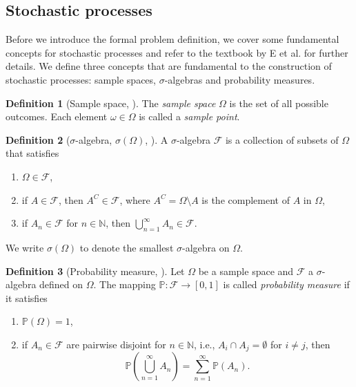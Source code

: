 \documentclass[12pt]{article}
\theoremstyle{definition}
\newtheorem{definition}[definition]{Definition}
\numberwithin{equation}{section}
\newcommand{\N}{\mathbb{N}}
\newcommand{\BP}{\mathbb{P}}
\newcommand{\CF}{\mathcal{F}}
\begin{document}
 \subsection{Stochastic processes}
 \label{subsec:stochastic_processes}
 Before we introduce the formal problem definition, we cover some fundamental concepts for stochastic processes and refer to the textbook by E et al.\cite{eAppliedStochasticAnalysis2021} for further details. We define three concepts that are fundamental to the construction of stochastic processes: sample spaces, $\sigma$-algebras and probability measures.
 \begin{definition}[Sample space,  ]
   The \emph{sample space} $\Omega$ is the set of all possible outcomes. Each element $\omega \in \Omega$ is called a \emph{sample point}.
 \end{definition}
 \begin{definition}[$\sigma$-algebra, $\sigma(\Omega)$, ]
   A $\sigma$-algebra $\CF$ is a collection of subsets of $\Omega$ that satisfies
   \begin{enumerate}[label=(\roman*)]
     \item $\Omega \in \CF$,
     \item if $A \in \CF$, then $A^C \in \CF$, where $A^C = \Omega \setminus A$ is the complement of $A$ in $\Omega$,
     \item if $A_n \in \CF$ for $n \in \N$, then $\bigcup_{n=1}^{\infty} A_n \in \CF$.
   \end{enumerate}
   We write $\sigma(\Omega)$ to denote the smallest $\sigma$-algebra on $\Omega$.
 \end{definition}
 \begin{definition}[Probability measure, ]
   Let $\Omega$ be a sample space and $\CF$ a $\sigma$-algebra defined on $\Omega$. The mapping $\BP : \CF \rightarrow [0,1]$ is called \emph{probability measure} if it satisfies
   \begin{enumerate}[label=(\roman*)]
     \item $\BP(\Omega) = 1$,
     \item if $A_n \in \CF$ are pairwise disjoint for $n\in\N$, i.e., $A_i \cap A_j = \emptyset$ for $i \neq j$, then
     \begin{equation*}
       \BP(\bigcup_{n=1}^{\infty}A_n) = \sum_{n=1}^{\infty}\BP(A_n).
     \end{equation*}
   \end{enumerate}
 \end{definition}
\end{document}
